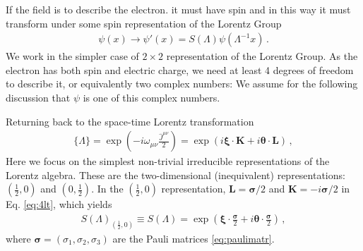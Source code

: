 If the field is to describe the electron. it must have spin and in this way it must transform under some spin representation of the Lorentz Group
\begin{align}
  \psi(x)\to \psi'(x)=S(\Lambda)\psi\left(\Lambda^{-1}x\right)\,.
\end{align}
We work in the simpler case of $2\times2$ representation of the
Lorentz Group. As the electron has both spin and electric charge, we
need at least 4 degrees of freedom to describe it, or equivalently two
complex numbers: We assume for the following discussion that $\psi$ is
one of this complex numbers.
 
Returning back to the space-time Lorentz transformation 
\begin{align}
\label{eq:4lt}
  \{\Lambda\}=\exp\left(-i\omega_{\mu\nu}\frac{\widehat{J}^{\mu\nu}}{2}\right)=
\exp\left( i\boldsymbol{\xi}\cdot\mathbf{K}+i\boldsymbol{\theta}\cdot\mathbf{L} \right)\,,
\end{align}
Here we focus on the simplest non-trivial irreducible representations of the Lorentz algebra. These are the two-dimensional (inequivalent) representations: $(\frac{1}{2},0)$ and $(0,\frac{1}{2})$. In the $(\frac{1}{2},0)$ representation, $\mathbf{L}=\boldsymbol{\sigma}/2$ and $\mathbf{K}=-i\boldsymbol{\sigma}/2$ in
Eq. \eqref{eq:4lt}, which yields
\begin{align}
\label{eq:SLet}
  S(\Lambda)_{\left( \frac{1}{2},0 \right)}\equiv S(\Lambda)=
\exp\left( \boldsymbol{\xi}\cdot \frac{\boldsymbol{\sigma}}{2}+i\boldsymbol{\theta}\cdot \frac{\boldsymbol{\sigma}}{2} \right)\,,
\end{align}
where $\boldsymbol{\sigma}=(\sigma_1,\sigma_2,\sigma_3)$ are the Pauli matrices \eqref{eq:paulimatr}.


